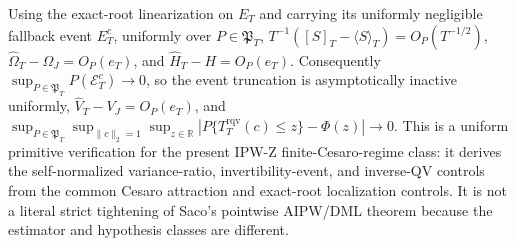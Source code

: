 Using the exact-root linearization on \(E_T\) and carrying its uniformly negligible fallback event \(E_T^c\), uniformly over \(P\in\mathfrak P_T\), \(T^{-1}([S]_T-\langle S\rangle_T)=O_P(T^{-1/2})\), \(\widehat\Omega_T-\Omega_J=O_P(e_T)\), and \(\widehat H_T-H=O_P(e_T)\). Consequently \(\sup_{P\in\mathfrak P_T}P(\mathcal E_T^c)\to0\), so the event truncation is asymptotically inactive uniformly, \(\widehat V_T-V_J=O_P(e_T)\), and \(\sup_{P\in\mathfrak P_T}\sup_{\|c\|_2=1}\sup_{z\in\mathbb R}|P\{T_T^{\mathrm{rqv}}(c)\le z\}-\Phi(z)|\to0\). This is a uniform primitive verification for the present IPW-Z finite-Cesaro-regime class: it derives the self-normalized variance-ratio, invertibility-event, and inverse-QV controls from the common Cesaro attraction and exact-root localization controls. It is not a literal strict tightening of Saco's pointwise AIPW/DML theorem because the estimator and hypothesis classes are different.